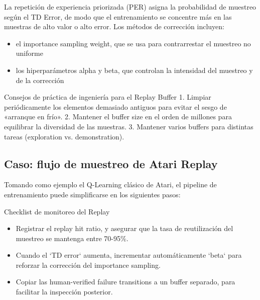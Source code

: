\documentclass[a4paper]{article}
\begin{document}
La repetición de experiencia priorizada (PER) asigna la probabilidad de muestreo según el TD Error, de modo que el entrenamiento se concentre más en las muestras de alto valor o alto error. Los métodos de corrección incluyen:

\begin{itemize}
    \item el importance sampling weight, que se usa para contrarrestar el muestreo no uniforme
    \item los hiperparámetros alpha y beta, que controlan la intensidad del muestreo y de la corrección
\end{itemize}

\begin{knowledgebox}{Consejos de práctica de ingeniería para el Replay Buffer}
1. Limpiar periódicamente los elementos demasiado antiguos para evitar el sesgo de «arranque en frío». 2. Mantener el buffer size en el orden de millones para equilibrar la diversidad de las muestras. 3. Mantener varios buffers para distintas tareas (exploration vs. demonstration).
\end{knowledgebox}

\subsection{Caso: flujo de muestreo de Atari Replay}

Tomando como ejemplo el Q-Learning clásico de Atari, el pipeline de entrenamiento puede simplificarse en los siguientes pasos:


\begin{importantbox}{Checklist de monitoreo del Replay}
\begin{itemize}
    \item Registrar el replay hit ratio, y asegurar que la tasa de reutilización del muestreo se mantenga entre 70-95\%.
    \item Cuando el `TD error` aumenta, incrementar automáticamente `beta` para reforzar la corrección del importance sampling.
    \item Copiar las human-verified failure transitions a un buffer separado, para facilitar la inspección posterior.
\end{itemize}
\end{importantbox}
\end{document}

